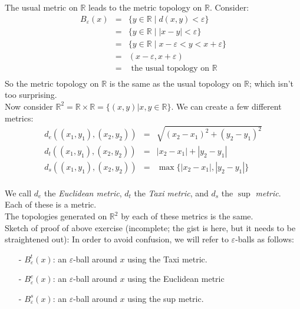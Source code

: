 \documentclass[12pt]{report}
\newcommand{\exercise}{ \noindent{\sc Exercise }\hspace{5pt} }
\newcommand{\reals}{\mathbb{R}}
\newcommand{\eball}{B_\varepsilon}
\begin{document}
The usual metric on $\reals$ leads to the metric topology on $\reals$.
Consider:
\begin{eqnarray*}
\eball(x) & = & \{y \in \reals \mid d(x,y) < \varepsilon\} \\
          & = & \{y \in \reals \mid |x-y| < \varepsilon\} \\
          & = & \{y \in \reals \mid x - \varepsilon < y < x + \varepsilon\} \\
          & = & (x - \varepsilon, x + \varepsilon) \\
          & = & \textrm{ the usual topology on } \reals \\
\end{eqnarray*}
So the metric topology on $\reals$ is the same as the usual topology on
$\reals$; which isn't too surprising.\\

Now consider $\reals^{2} = \reals \times \reals = \{(x,y)|x,y \in \reals\}$.
We can create a few different metrics: 
\begin{eqnarray*}
d_e((x_1,y_1),(x_2,y_2)) & = & \sqrt{(x_2 - x_1)^2 + (y_2 - y_1)^2} \\
d_t((x_1,y_1),(x_2,y_2)) & = & |x_2 - x_1| + |y_2 - y_1| \\
d_s((x_1,y_1),(x_2,y_2)) & = & \max\{|x_2 - x_1|, |y_2 - y_1|\} \\
\end{eqnarray*}

We call $d_e$ the  {\em Euclidean metric}, $d_t$ the
 {\em Taxi metric}, and $d_s$ the 
$\sup$ {\em metric}. \\

\exercise Each of these is a metric.\\

\exercise The topologies generated on $\reals^2$ by each of these
metrics is the same.\\

Sketch of proof of above exercise (incomplete; the gist is here, but it needs
to be straightened out): 
In order to avoid confusion, we will refer to $\varepsilon$-balls as
follows:
\begin{itemize}
\item[-] $\eball^t(x)$: an $\varepsilon$-ball around $x$ using the Taxi
metric.
\item[-] $\eball^e(x)$: an $\varepsilon$-ball around $x$ using the Euclidean
metric
\item[-] $\eball^s(x)$: an $\varepsilon$-ball around $x$ using the sup metric.
\end{itemize}
\end{document}
